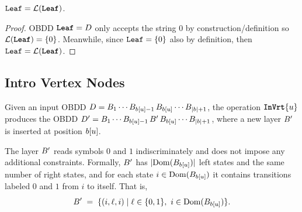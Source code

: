 


\begin{lemma}
\label{lemma:SymbolicLeaf}
    $\texttt{Leaf} = \mathcal{L}(\texttt{\textbf{Leaf}})$. 
\end{lemma}
\begin{proof}
    OBDD $\texttt{\textbf{Leaf}} = D$ only accepts the string $0$ by construction/definition so $\mathcal{L}(\texttt{\textbf{Leaf}}) = \{0\}$. Meanwhile, since $\texttt{Leaf} =  \{0\}$ also by definition, then $\texttt{Leaf} = \mathcal{L}(\texttt{\textbf{Leaf}})$.
\end{proof}


\subsection{Intro Vertex Nodes}

Given an input OBDD
$D = B_1 \cdots B_{b[u]-1}\,
B_{b[u]}\cdots B_{|b|+1}$,
the operation $\texttt{\textbf{InVrt}}\{u\}$ produces the OBDD
$D' = B_1 \cdots B_{b[u]-1}\,
B'\,B_{b[u]}\cdots B_{|b|+1}$,
where a new layer $B'$ is inserted at position $b[u]$.

The layer $B'$ reads symbols $0$ and $1$ indiscriminately and does not impose
any additional constraints. Formally, $B'$ has
$|\mathrm{Dom}(B_{b[u]})|$ left states and the same number of right states,
and for each state $i \in \mathrm{Dom}(B_{b[u]})$ it contains transitions
labeled $0$ and $1$ from $i$ to itself. That is,
\[
B' \;=\; \{(i,\ell,i) \mid \ell \in \{0,1\},\ i \in \mathrm{Dom}(B_{b[u]})\}.
\]




